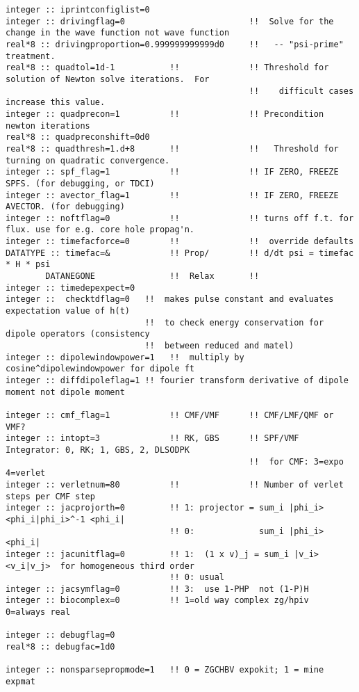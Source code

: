 \begin{verbatim}
integer :: iprintconfiglist=0
integer :: drivingflag=0                         !!  Solve for the change in the wave function not wave function 
real*8 :: drivingproportion=0.999999999999d0     !!   -- "psi-prime" treatment.
real*8 :: quadtol=1d-1           !!              !! Threshold for solution of Newton solve iterations.  For
                                                 !!    difficult cases increase this value.
integer :: quadprecon=1          !!              !! Precondition newton iterations
real*8 :: quadpreconshift=0d0
real*8 :: quadthresh=1.d+8       !!              !!   Threshold for turning on quadratic convergence.
integer :: spf_flag=1            !!              !! IF ZERO, FREEZE SPFS. (for debugging, or TDCI)
integer :: avector_flag=1        !!              !! IF ZERO, FREEZE AVECTOR. (for debugging)
integer :: noftflag=0            !!              !! turns off f.t. for flux. use for e.g. core hole propag'n.
integer :: timefacforce=0        !!              !!  override defaults
DATATYPE :: timefac=&            !! Prop/        !! d/dt psi = timefac * H * psi
        DATANEGONE               !!  Relax       !!
integer :: timedepexpect=0
integer ::  checktdflag=0   !!  makes pulse constant and evaluates expectation value of h(t) 
                            !!  to check energy conservation for dipole operators (consistency 
                            !!  between reduced and matel)
integer :: dipolewindowpower=1   !!  multiply by cosine^dipolewindowpower for dipole ft
integer :: diffdipoleflag=1 !! fourier transform derivative of dipole moment not dipole moment

integer :: cmf_flag=1            !! CMF/VMF      !! CMF/LMF/QMF or VMF?
integer :: intopt=3              !! RK, GBS      !! SPF/VMF Integrator: 0, RK; 1, GBS, 2, DLSODPK  
                                                 !!  for CMF: 3=expo 4=verlet
integer :: verletnum=80          !!              !! Number of verlet steps per CMF step
integer :: jacprojorth=0         !! 1: projector = sum_i |phi_i> <phi_i|phi_i>^-1 <phi_i|
                                 !! 0:             sum_i |phi_i> <phi_i|
integer :: jacunitflag=0         !! 1:  (1 x v)_j = sum_i |v_i><v_i|v_j>  for homogeneous third order
                                 !! 0: usual          
integer :: jacsymflag=0          !! 3:  use 1-PHP  not (1-P)H
integer :: biocomplex=0          !! 1=old way complex zg/hpiv  0=always real

integer :: debugflag=0
real*8 :: debugfac=1d0

integer :: nonsparsepropmode=1   !! 0 = ZGCHBV expokit; 1 = mine expmat
\end{verbatim}
